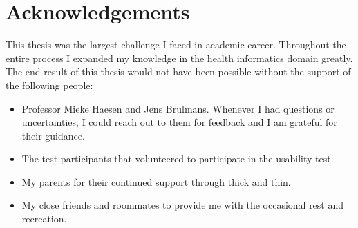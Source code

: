 \section*{Acknowledgements}

This thesis was the largest challenge I faced in academic career. Throughout the entire process I expanded my knowledge in the health informatics domain greatly. The end result of this thesis would not have been possible without the support of the following people:
\begin{itemize}
    \item Professor Mieke Haesen and Jens Brulmans. Whenever I had questions or uncertainties, I could reach out to them for feedback and I am grateful for their guidance.
    \item The test participants that volunteered to participate in the usability test.
    \item My parents for their continued support through thick and thin.
    \item My close friends and roommates to provide me with the occasional rest and recreation.
\end{itemize}